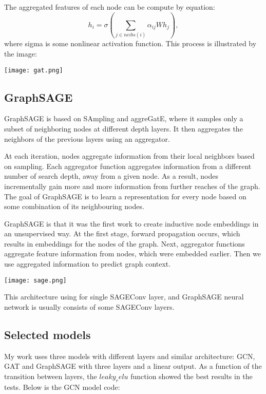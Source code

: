 \documentclass[a4paper,14pt]{article}
\begin{document}
The aggregated features of each node can be compute by equation:
\begin{equation}
    h_i = \sigma(\sum_{j \in neibs(i)}\alpha_{ij}Wh_j),
\end{equation}
where sigma is some nonlinear activation function. This process is illustrated by the image:

\texttt{[image: gat.png]}


\subsection{GraphSAGE}
GraphSAGE \cite{SAGE} is based on SAmpling and aggreGatE, where it samples only a subset of neighboring nodes at different depth layers. It then aggregates the neighbors of the previous layers using an aggregator.

At each iteration, nodes aggregate information from their local neighbors based on sampling. Each aggregator function aggregates information from a different number of search depth, away from a given node. As a result, nodes incrementally gain more and more information from further reaches of the graph. The goal of GraphSAGE is to learn a representation for every node based on some combination of its neighbouring nodes.

GraphSAGE is that it was the first work to create inductive node embeddings in an unsupervised way. At the first stage, forward propagation occurs, which results in embeddings for the nodes of the graph. Next, aggregator functions aggregate feature information from nodes, which were embedded earlier. Then we use aggregated information to predict graph context.

\texttt{[image: sage.png]}

This architecture using for single SAGEConv layer, and GraphSAGE neural network is usually consists of some SAGEConv layers.

\subsection{Selected models}
My work uses three models with different layers and similar architecture:
GCN, GAT and GraphSAGE with three layers and a linear output. As a function of the transition between layers, the $leaky_relu$ function showed the best results in the tests. Below is the GCN model code:
\end{document}
